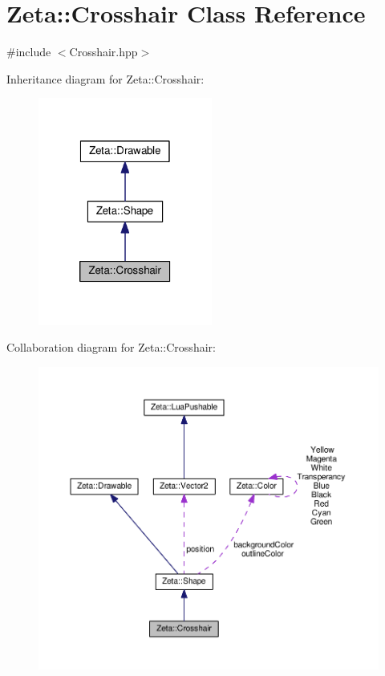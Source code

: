 \hypertarget{classZeta_1_1Crosshair}{\section{Zeta\+:\+:Crosshair Class Reference}
\label{classZeta_1_1Crosshair}
}


{\ttfamily \#include $<$Crosshair.\+hpp$>$}



Inheritance diagram for Zeta\+:\+:Crosshair\+:\nopagebreak
\begin{figure}[H]
\begin{center}
\leavevmode
\includegraphics[width=162pt]{classZeta_1_1Crosshair__inherit__graph}
\end{center}
\end{figure}


Collaboration diagram for Zeta\+:\+:Crosshair\+:\nopagebreak
\begin{figure}[H]
\begin{center}
\leavevmode
\includegraphics[width=350pt]{classZeta_1_1Crosshair__coll__graph}
\end{center}
\end{figure}
